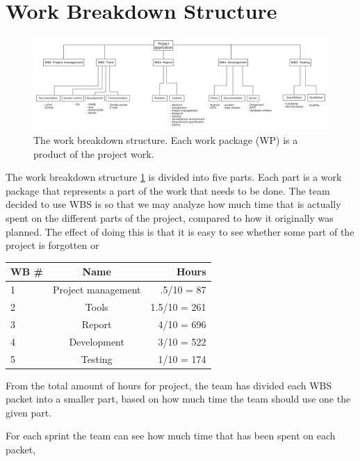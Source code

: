 \section{Work Breakdown Structure}

\begin{figure}[H]
\includegraphics[width=\textwidth]{ch/planning/fig/wbs.png}
\caption{The work breakdown structure. Each work package (WP) is a product of the project work.}
\label{fig:wbs}
\end{figure}


The work breakdown structure \ref{fig:wbs} is divided into five parts. Each part is a work package that represents a part of the work that needs to be done.
The team decided to use WBS is so that we may analyze how much time that is actually spent on the different parts of the project, compared to how it originally was planned.
The effect of doing this is that it is easy to see whether some part of the project is forgotten or 

\begin{table}[H]
\centering
{}
\begin{tabular}{|l|c|r|}
\hline
    \textbf{WB \#} & \textbf{Name} & \textbf{Hours} \\\hline
    1 & Project management & .5/10 = 87\\\hline
    2 & Tools 			   & 1.5/10 = 261\\\hline
    3 & Report 			   & 4/10 = 696\\\hline
    4 & Development 	   & 3/10 = 522\\\hline
    5 & Testing  		   & 1/10 = 174\\\hline
\end{tabular}
\end{table}

From the total amount of hours for project, the team has divided each WBS packet into a smaller part, based on how much time the team should use one the given part.

For each sprint the team can see how much time that has been spent on each packet, 